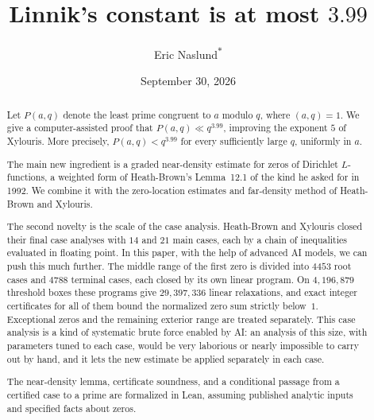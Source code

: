 \documentclass[11pt]{amsart}
\numberwithin{equation}{section}
\theoremstyle{plain}
\theoremstyle{definition}
\theoremstyle{remark}
\newcommand{\1}{\mathbf{1}}
\begin{document}
\title{Linnik's constant is at most $3.99$}

\author[Eric Naslund]{Eric Naslund\textsuperscript{$*$}}

\date{September 30, 2026}


\begin{abstract}
Let $P(a,q)$ denote the least prime congruent to $a$ modulo $q$, where $(a,q)=1$.
We give a computer-assisted proof that $P(a,q)\ll q^{3.99}$, improving the exponent $5$
of Xylouris. More precisely, $P(a,q)<q^{3.99}$ for every sufficiently large $q$, uniformly
in $a$.

The main new ingredient is a graded near-density estimate for zeros of Dirichlet
$L$-functions, a weighted form of Heath-Brown's Lemma~12.1 of the kind he asked for in 1992. We
combine it with the zero-location estimates and far-density method of Heath-Brown and Xylouris.

The second novelty is the scale of the case analysis. Heath-Brown and Xylouris closed their final
case analyses with $14$ and $21$ main cases, each by a chain of inequalities evaluated in floating
point. In this paper, with the help of advanced AI models, we can push this much further. The middle range of the first zero is divided into $4453$ root cases and $4788$
terminal cases, each closed by its own linear program. On $4{,}196{,}879$ threshold boxes these
programs give $29{,}397{,}336$ linear relaxations, and exact integer certificates for all of them
bound the normalized zero sum strictly below~$1$. Exceptional
zeros and the remaining exterior range are treated separately. This case analysis is a kind of
systematic brute force enabled by AI: an analysis of this size, with parameters tuned to each case,
would be very laborious or nearly impossible to carry out by hand, and it lets the new estimate be
applied separately in each case.

The near-density lemma, certificate soundness, and a conditional passage from a certified
case to a prime are formalized in Lean, assuming published analytic inputs and specified
facts about zeros.
\end{abstract}

\maketitle
\end{document}
